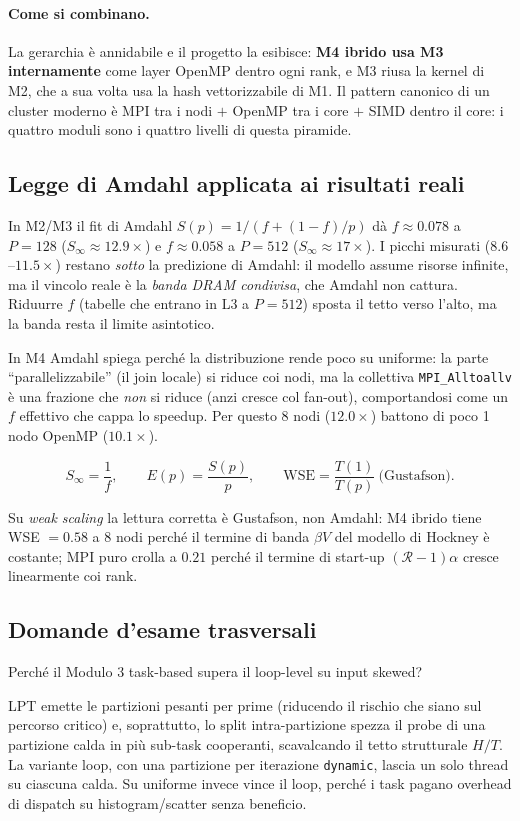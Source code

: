 \documentclass[11pt,a4paper]{article}
\theoremstyle{remark}
\newenvironment{esercizio}[1][]{%
  \begin{tcolorbox}[breakable,title={\textbf{Esercizio / Domanda d'esame}\ifx&#1&\else: #1\fi},
    colback=yellow!5!white, colframe=orange!75!black, fonttitle=\small\bfseries]%
}{%
  \end{tcolorbox}%
}
\newenvironment{risposta}{%
  \begin{tcolorbox}[breakable,title={\textbf{Risposta}},
    colback=green!5!white, colframe=green!50!black, fonttitle=\small\bfseries]%
}{%
  \end{tcolorbox}%
}
\begin{document}
\paragraph{Come si combinano.} La gerarchia \`e annidabile e il progetto la esibisce: \textbf{M4 ibrido usa M3 internamente} come layer OpenMP dentro ogni rank, e M3 riusa la kernel di M2, che a sua volta usa la hash vettorizzabile di M1. Il pattern canonico di un cluster moderno \`e MPI tra i nodi $+$ OpenMP tra i core $+$ SIMD dentro il core: i quattro moduli sono i quattro livelli di questa piramide.

\subsection{Legge di Amdahl applicata ai risultati reali}

In M2/M3 il fit di Amdahl $S(p)=1/(f+(1-f)/p)$ d\`a $f\approx 0.078$ a $P=128$ ($S_\infty\approx 12.9\times$) e $f\approx 0.058$ a $P=512$ ($S_\infty\approx 17\times$). I picchi misurati ($8.6$--$11.5\times$) restano \emph{sotto} la predizione di Amdahl: il modello assume risorse infinite, ma il vincolo reale \`e la \emph{banda DRAM condivisa}, che Amdahl non cattura. Riduurre $f$ (tabelle che entrano in L3 a $P=512$) sposta il tetto verso l'alto, ma la banda resta il limite asintotico.

In M4 Amdahl spiega perch\'e la distribuzione rende poco su uniforme: la parte ``parallelizzabile'' (il join locale) si riduce coi nodi, ma la collettiva \texttt{MPI\_Alltoallv} \`e una frazione che \emph{non} si riduce (anzi cresce col fan-out), comportandosi come un $f$ effettivo che cappa lo speedup. Per questo 8 nodi ($12.0\times$) battono di poco 1 nodo OpenMP ($10.1\times$).

\[
  S_\infty=\frac{1}{f},\qquad
  E(p)=\frac{S(p)}{p},\qquad
  \text{WSE}=\frac{T(1)}{T(p)}\ \text{(Gustafson)}.
\]

Su \emph{weak scaling} la lettura corretta \`e Gustafson, non Amdahl: M4 ibrido tiene WSE $=0.58$ a 8 nodi perch\'e il termine di banda $\beta V$ del modello di Hockney \`e costante; MPI puro crolla a $0.21$ perch\'e il termine di start-up $(\mathcal{R}-1)\alpha$ cresce linearmente coi rank.

\subsection{Domande d'esame trasversali}

\begin{esercizio}[1 -- Task vs loop su skew]
Perch\'e il Modulo 3 task-based supera il loop-level su input skewed?
\end{esercizio}
\begin{risposta}
LPT emette le partizioni pesanti per prime (riducendo il rischio che siano sul percorso critico) e, soprattutto, lo split intra-partizione spezza il probe di una partizione calda in pi\`u sub-task cooperanti, scavalcando il tetto strutturale $H/T$. La variante loop, con una partizione per iterazione \texttt{dynamic}, lascia un solo thread su ciascuna calda. Su uniforme invece vince il loop, perch\'e i task pagano overhead di dispatch su histogram/scatter senza beneficio.
\end{risposta}
\end{document}
